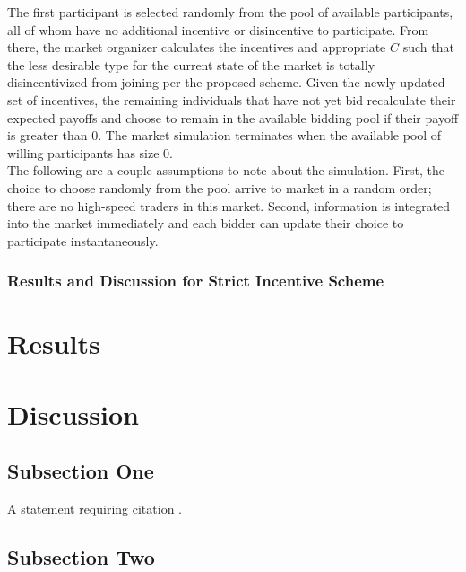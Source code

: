 \documentclass[twoside,twocolumn]{article}
\begin{document}
The first participant is selected randomly from the pool of available participants, all of whom have no additional incentive or disincentive to participate. From there, the market organizer calculates the incentives and appropriate $C$ such that the less desirable type for the current state of the market is totally disincentivized from joining per the proposed scheme. Given the newly updated set of incentives, the remaining individuals that have not yet bid recalculate their expected payoffs and choose to remain in the available bidding pool if their payoff is greater than 0. The market simulation terminates when the available pool of willing participants has size 0.\\

The following are a couple assumptions to note about the simulation. First, the choice to choose randomly from the pool arrive to market in a random order; there are no high-speed traders in this market. Second, information is integrated into the market immediately and each bidder can update their choice to participate instantaneously.

\subsubsection{Results and Discussion for Strict Incentive Scheme}














\section{Results}



\section{Discussion}

\subsection{Subsection One}

A statement requiring citation \cite{Figueredo:2009dg}.
\blindtext %

\subsection{Subsection Two}
\end{document}
